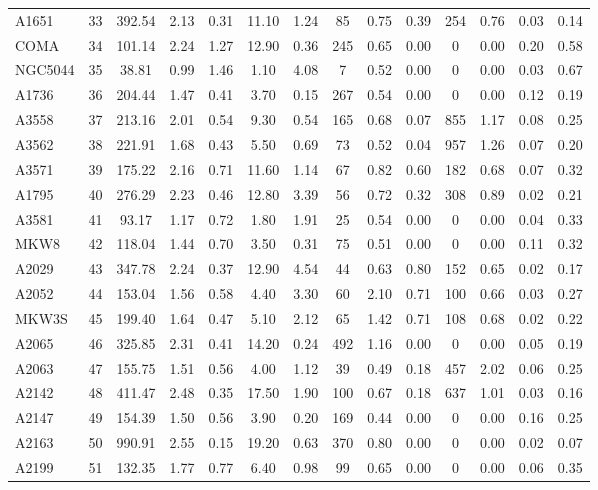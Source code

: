 \documentclass[10pt,aps,pra,reprint,amsmath,amsfonts,amssymb,showpacs,nofootinbib,floatfix]{revtex4-1}
\newcommand{\vst}{\vspace{-0.14mm}}
\begin{document}
\begin{table}
\begin{minipage}{2.0\columnwidth}
\begin{tabular}{l c c c c c c c c c c c c c}
A1651 & 33 & 392.54 & 2.13 & 0.31 & 11.10 & 1.24 & 85 & 0.75 & 0.39 & 254 & 0.76 & 0.03 & 0.14 \vst \\
COMA & 34 & 101.14 & 2.24 & 1.27 & 12.90 & 0.36 & 245 & 0.65 & 0.00 & 0 & 0.00 & 0.20 & 0.58 \vst \\
NGC5044 & 35 & 38.81 & 0.99 & 1.46 & 1.10 & 4.08 & 7 & 0.52 & 0.00 & 0 & 0.00 & 0.03 & 0.67 \vst \\
A1736 & 36 & 204.44 & 1.47 & 0.41 & 3.70 & 0.15 & 267 & 0.54 & 0.00 & 0 & 0.00 & 0.12 & 0.19 \vst \\
A3558 & 37 & 213.16 & 2.01 & 0.54 & 9.30 & 0.54 & 165 & 0.68 & 0.07 & 855 & 1.17 & 0.08 & 0.25 \vst \\
A3562 & 38 & 221.91 & 1.68 & 0.43 & 5.50 & 0.69 & 73 & 0.52 & 0.04 & 957 & 1.26 & 0.07 & 0.20 \vst \\
A3571 & 39 & 175.22 & 2.16 & 0.71 & 11.60 & 1.14 & 67 & 0.82 & 0.60 & 182 & 0.68 & 0.07 & 0.32 \vst \\
A1795 & 40 & 276.29 & 2.23 & 0.46 & 12.80 & 3.39 & 56 & 0.72 & 0.32 & 308 & 0.89 & 0.02 & 0.21 \vst \\
A3581 & 41 & 93.17 & 1.17 & 0.72 & 1.80 & 1.91 & 25 & 0.54 & 0.00 & 0 & 0.00 & 0.04 & 0.33 \vst \\
MKW8 & 42 & 118.04 & 1.44 & 0.70 & 3.50 & 0.31 & 75 & 0.51 & 0.00 & 0 & 0.00 & 0.11 & 0.32 \vst \\
A2029 & 43 & 347.78 & 2.24 & 0.37 & 12.90 & 4.54 & 44 & 0.63 & 0.80 & 152 & 0.65 & 0.02 & 0.17 \vst \\
A2052 & 44 & 153.04 & 1.56 & 0.58 & 4.40 & 3.30 & 60 & 2.10 & 0.71 & 100 & 0.66 & 0.03 & 0.27 \vst \\
MKW3S & 45 & 199.40 & 1.64 & 0.47 & 5.10 & 2.12 & 65 & 1.42 & 0.71 & 108 & 0.68 & 0.02 & 0.22 \vst \\
A2065 & 46 & 325.85 & 2.31 & 0.41 & 14.20 & 0.24 & 492 & 1.16 & 0.00 & 0 & 0.00 & 0.05 & 0.19 \vst \\
A2063 & 47 & 155.75 & 1.51 & 0.56 & 4.00 & 1.12 & 39 & 0.49 & 0.18 & 457 & 2.02 & 0.06 & 0.25 \vst \\
A2142 & 48 & 411.47 & 2.48 & 0.35 & 17.50 & 1.90 & 100 & 0.67 & 0.18 & 637 & 1.01 & 0.03 & 0.16 \vst \\
A2147 & 49 & 154.39 & 1.50 & 0.56 & 3.90 & 0.20 & 169 & 0.44 & 0.00 & 0 & 0.00 & 0.16 & 0.25 \vst \\
A2163 & 50 & 990.91 & 2.55 & 0.15 & 19.20 & 0.63 & 370 & 0.80 & 0.00 & 0 & 0.00 & 0.02 & 0.07 \vst \\
A2199 & 51 & 132.35 & 1.77 & 0.77 & 6.40 & 0.98 & 99 & 0.65 & 0.00 & 0 & 0.00 & 0.06 & 0.35 \vst \\

\end{tabular}
\end{minipage}
\end{table}
\end{document}
